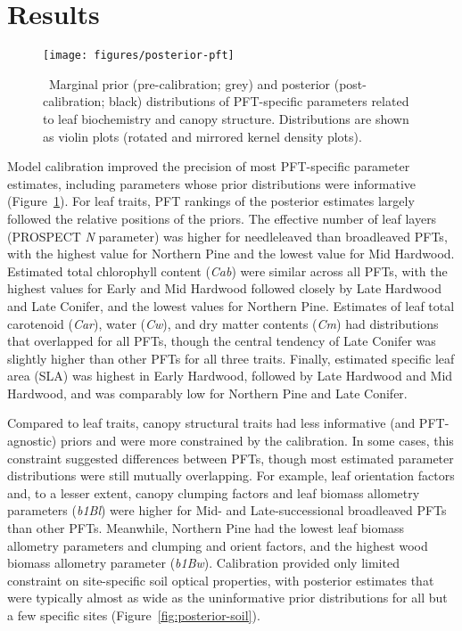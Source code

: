 \section{Results}

\begin{figure}
  \centering
  \texttt{[image: figures/posterior-pft]}
  \caption{\label{fig:posterior-pft}\
    Marginal prior (pre-calibration; grey) and posterior (post-calibration; black) distributions of PFT-specific parameters
    related to leaf biochemistry and canopy structure.
    Distributions are shown as violin plots (rotated and mirrored kernel density plots).
  }
\end{figure}

Model calibration improved the precision of most PFT-specific parameter estimates, including parameters whose prior distributions were informative (Figure~\ref{fig:posterior-pft}).
For leaf traits, PFT rankings of the posterior estimates largely followed the relative positions of the priors.
The effective number of leaf layers (PROSPECT \emph{N} parameter) was higher for needleleaved than broadleaved PFTs, with the highest value for Northern Pine and the lowest value for Mid Hardwood.
Estimated total chlorophyll content (\emph{Cab}) were similar across all PFTs, with the highest values for Early and Mid Hardwood followed closely by Late Hardwood and Late Conifer, and the lowest values for Northern Pine.
Estimates of leaf total carotenoid (\emph{Car}), water (\emph{Cw}), and dry matter contents (\emph{Cm}) had distributions that overlapped for all PFTs, though the central tendency of Late Conifer was slightly higher than other PFTs for all three traits.
Finally, estimated specific leaf area (SLA) was highest in Early Hardwood, followed by Late Hardwood and Mid Hardwood, and was comparably low for Northern Pine and Late Conifer.

Compared to leaf traits, canopy structural traits had less informative (and PFT-agnostic) priors and were more constrained by the calibration.
In some cases, this constraint suggested differences between PFTs, though most estimated parameter distributions were still mutually overlapping.
For example, leaf orientation factors and, to a lesser extent, canopy clumping factors and leaf biomass allometry parameters (\emph{b1Bl}) were higher for Mid- and Late-successional broadleaved PFTs than other PFTs.
Meanwhile, Northern Pine had the lowest leaf biomass allometry parameters and clumping and orient factors, and the highest wood biomass allometry parameter (\emph{b1Bw}).
Calibration provided only limited constraint on site-specific soil optical properties, with posterior estimates that were typically almost as wide as the uninformative prior distributions for all but a few specific sites (Figure~\ref{fig:posterior-soil}).

